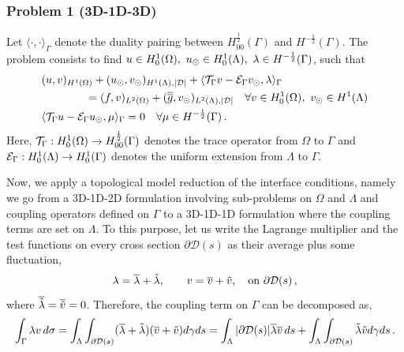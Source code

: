 \documentclass[r]{siamart171218}
\begin{document}
\subsubsection*{Problem 1 (3D-1D-3D)}
Let $\langle \cdot , \cdot \rangle_\Gamma$ denote the duality pairing between 
$H^\frac12_{00}(\Gamma)$ and $H^{-\frac12}(\Gamma)$. The problem consists to find $u \in H^1_0(\Omega),\ u_{\odot} \in H^1_0(\Lambda), \ \lambda \in H^{-\frac12}(\Gamma )$, such that
\begin{subequations}\label{eq:problem1}
\begin{align}
&(u,v)_{H^1(\Omega)} + (u_{\odot},v_{\odot})_{H^1(\Lambda),|\mathcal{D}|} 
+ \langle {\mathcal{T}_\Gamma} v  - \mathcal{E}_\Gamma v_{\odot}, \lambda \rangle_\Gamma
\\
\nonumber
&\qquad\qquad= (f,v)_{L^2(\Omega)} +  (\overline{\overline{g}},v_{\odot})_{L^2(\Lambda),|\mathcal{D}|}
\quad \forall v \in H^1_0(\Omega), \ v_{\odot} \in H^1(\Lambda)
\\
&   \langle {\mathcal{T}_\Gamma} u - \mathcal{E}_\Gamma u_{\odot} , \mu \rangle_\Gamma = 0
\quad \forall \mu \in H^{-\frac12}(\Gamma)\,.
\end{align}
\end{subequations}
Here, ${\mathcal{T}_\Gamma}:H^1_0(\Omega) \rightarrow H^{\frac 12}_{00}(\Gamma)$ denotes the trace operator from $\Omega$ to $\Gamma$ and $\mathcal{E}_\Gamma: H^1_0(\Lambda) \rightarrow H^1_{0}(\Gamma)$ denotes the uniform extension from $\Lambda$ to $\Gamma$.  

Now, we apply a topological model reduction of the interface conditions, namely we go from a 3D-1D-2D formulation
involving sub-problems on $\Omega$ and $\Lambda$ and coupling operators defined on $\Gamma$
to a 3D-1D-1D formulation where the coupling terms are set on $\Lambda$. 
To this purpose, let us write the Lagrange multiplier and the test functions on every cross section $\partial\mathcal{D}(s)$ as their average plus some fluctuation,
\begin{equation*}
\lambda=\overline{\lambda}+\tilde{\lambda}, \qquad v=\overline{v}+\tilde{v},
\quad \text{on} \ \partial\mathcal{D}(s)\,,
\end{equation*}
where $\overline{\tilde{\lambda}}=\overline{\tilde{v}}=0$. 
Therefore, the coupling term on $\Gamma$ can be decomposed as,
\begin{equation*}
\int_{\Gamma}\lambda v\, d\sigma
=\int _{\Lambda}  \int_{\partial\mathcal{D}(s)} (\overline{\lambda}+\tilde{\lambda})(\overline{v}+\tilde{v})d\gamma ds
= \int_{\Lambda}|\partial\mathcal{D}(s)| \overline{\lambda}\overline{v}\,ds+\int_{\Lambda}  \int_{\partial\mathcal{D}(s)} \tilde{\lambda}\tilde{v}d\gamma ds\,.
\end{equation*}
\end{document}
